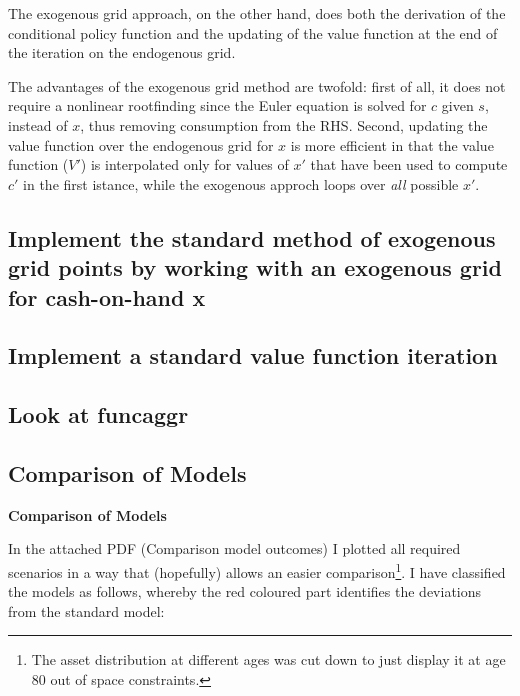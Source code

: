 \documentclass[12pt,a4paper]{article}
\begin{document}
The exogenous grid approach, on the other hand, does both the derivation of the conditional policy function and the updating of the value function at the end of the iteration on the endogenous grid.

The advantages of the exogenous grid method are twofold: first of all, it does not require a nonlinear rootfinding since the Euler equation is solved for $c$ given $s$, instead of $x$, thus removing consumption from the RHS. Second, updating the value function over the endogenous grid for $x$ is more efficient in that the value function ($V'$) is interpolated only for values of $x'$ that have been used to compute $c'$ in the first istance, while the exogenous approch loops over \textit{all} possible $x'$.



\subsection*{Implement the standard method of exogenous grid points by working with an exogenous grid for cash-on-hand x}

\subsection*{Implement a standard value function iteration}

\subsection*{Look at funcaggr}

\subsection*{Comparison of Models}
\textbf{Comparison of Models}

In the attached PDF (Comparison model outcomes) I plotted all required scenarios in a way that (hopefully) allows an easier comparison\footnote{The asset distribution at different ages was cut down to just display it at age 80 out of space constraints.}. I have classified the models as follows, whereby the red coloured part identifies the deviations from the standard model:
\end{document}
